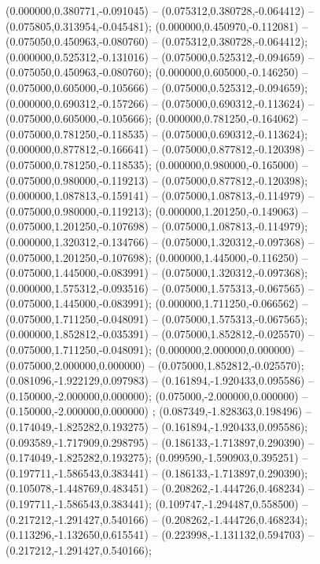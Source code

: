  (0.000000,0.380771,-0.091045) -- (0.075312,0.380728,-0.064412) -- (0.075805,0.313954,-0.045481);
 (0.000000,0.450970,-0.112081) -- (0.075050,0.450963,-0.080760) -- (0.075312,0.380728,-0.064412);
 (0.000000,0.525312,-0.131016) -- (0.075000,0.525312,-0.094659) -- (0.075050,0.450963,-0.080760);
 (0.000000,0.605000,-0.146250) -- (0.075000,0.605000,-0.105666) -- (0.075000,0.525312,-0.094659);
 (0.000000,0.690312,-0.157266) -- (0.075000,0.690312,-0.113624) -- (0.075000,0.605000,-0.105666);
 (0.000000,0.781250,-0.164062) -- (0.075000,0.781250,-0.118535) -- (0.075000,0.690312,-0.113624);
 (0.000000,0.877812,-0.166641) -- (0.075000,0.877812,-0.120398) -- (0.075000,0.781250,-0.118535);
 (0.000000,0.980000,-0.165000) -- (0.075000,0.980000,-0.119213) -- (0.075000,0.877812,-0.120398);
 (0.000000,1.087813,-0.159141) -- (0.075000,1.087813,-0.114979) -- (0.075000,0.980000,-0.119213);
 (0.000000,1.201250,-0.149063) -- (0.075000,1.201250,-0.107698) -- (0.075000,1.087813,-0.114979);
 (0.000000,1.320312,-0.134766) -- (0.075000,1.320312,-0.097368) -- (0.075000,1.201250,-0.107698);
 (0.000000,1.445000,-0.116250) -- (0.075000,1.445000,-0.083991) -- (0.075000,1.320312,-0.097368);
 (0.000000,1.575312,-0.093516) -- (0.075000,1.575313,-0.067565) -- (0.075000,1.445000,-0.083991);
 (0.000000,1.711250,-0.066562) -- (0.075000,1.711250,-0.048091) -- (0.075000,1.575313,-0.067565);
 (0.000000,1.852812,-0.035391) -- (0.075000,1.852812,-0.025570) -- (0.075000,1.711250,-0.048091);
 (0.000000,2.000000,0.000000) -- (0.075000,2.000000,0.000000) -- (0.075000,1.852812,-0.025570);
 (0.081096,-1.922129,0.097983) -- (0.161894,-1.920433,0.095586) -- (0.150000,-2.000000,0.000000);
 (0.075000,-2.000000,0.000000) -- (0.150000,-2.000000,0.000000) ;
 (0.087349,-1.828363,0.198496) -- (0.174049,-1.825282,0.193275) -- (0.161894,-1.920433,0.095586);
 (0.093589,-1.717909,0.298795) -- (0.186133,-1.713897,0.290390) -- (0.174049,-1.825282,0.193275);
 (0.099590,-1.590903,0.395251) -- (0.197711,-1.586543,0.383441) -- (0.186133,-1.713897,0.290390);
 (0.105078,-1.448769,0.483451) -- (0.208262,-1.444726,0.468234) -- (0.197711,-1.586543,0.383441);
 (0.109747,-1.294487,0.558500) -- (0.217212,-1.291427,0.540166) -- (0.208262,-1.444726,0.468234);
 (0.113296,-1.132650,0.615541) -- (0.223998,-1.131132,0.594703) -- (0.217212,-1.291427,0.540166);
